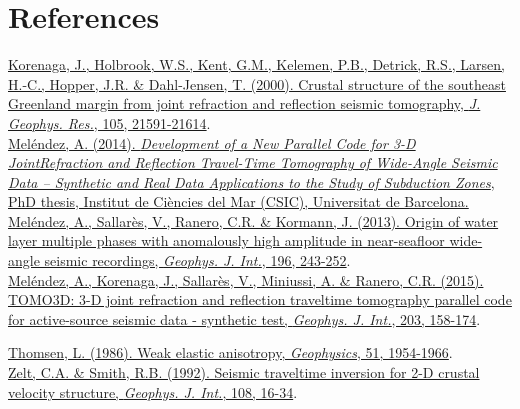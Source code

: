 \documentclass[twoside,final,onecolumn]{article}
\begin{document}
\section{References}

\href{http://www.dx.doi.org/10.1029/2000JB900188}{Korenaga, J., Holbrook, W.S., Kent, G.M., Kelemen, P.B., Detrick, R.S., Larsen, H.-C., Hopper, J.R. \& Dahl-Jensen, T. (2000).
Crustal structure of the southeast Greenland margin from joint refraction and reflection seismic tomography, \textit{J. Geophys. Res.}, 105, 21591-21614}.\\

\href{http://www.tdx.cat/handle/10803/289786}{Mel\'{e}ndez, A. (2014). \textit{Development of a New Parallel Code for 3-D JointRefraction and Reflection Travel-Time Tomography of Wide-Angle Seismic Data
– Synthetic and Real Data Applications to the Study of Subduction Zones}, PhD thesis, Institut de Ciències del Mar (CSIC), Universitat de Barcelona.}\\

\href{http://www.dx.doi.org/10.1093/gji/ggt391}{Mel\'{e}ndez, A., Sallar\`{e}s, V., Ranero, C.R. \& Kormann, J. (2013). Origin of water layer multiple phases
with anomalously high amplitude in near-seafloor wide-angle seismic recordings, \textit{Geophys. J. Int.}, 196, 243-252}.\\

\href{http://www.dx.doi.org/10.1093/gji/ggv292}{Mel\'{e}ndez, A., Korenaga, J., Sallar\`{e}s, V., Miniussi, A. \& Ranero, C.R. (2015). TOMO3D: 3-D joint refraction and
reflection traveltime tomography parallel code for active-source seismic data - synthetic test, \textit{Geophys. J. Int.}, 203, 158-174}.

\href{http://www.dx.doi.org/10.1190/1.1442051}{Thomsen, L. (1986). Weak elastic anisotropy, \textit{Geophysics}, 51, 1954-1966}.\\

\href{http://www.dx.doi.org/10.1111/j.1365-246X.1992.tb00836.x}{Zelt, C.A. \& Smith, R.B. (1992). Seismic traveltime inversion for 2-D crustal velocity structure, \textit{Geophys. J. Int.}, 108, 16-34}.
\end{document}
